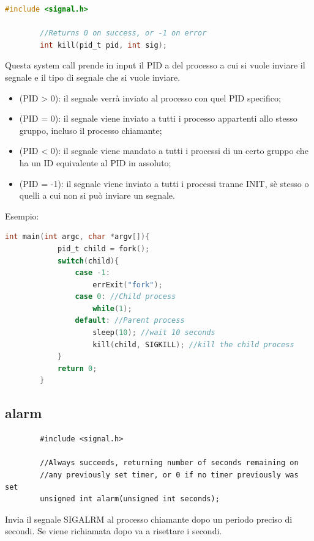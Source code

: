 \documentclass[a4paper, 12pt]{book}
\begin{document}
    \begin{lstlisting}[language=C]
        #include <signal.h>

        //Returns 0 on success, or -1 on error 
        int kill(pid_t pid, int sig);
    \end{lstlisting}
    Questa system call prende in input il PID a del processo 
    a cui si vuole inviare il segnale e il tipo di segnale che 
    si vuole inviare. 
    \begin{itemize}
        \item (PID > 0): il segnale verrà inviato al processo con quel PID specifico;
        \item (PID = 0): il segnale viene inviato a tutti i processo appartenti allo stesso gruppo, incluso il processo chiamante;
        \item (PID < 0): il segnale viene mandato a tutti i processi di un certo gruppo che ha un ID equivalente al PID in assoluto;
        \item (PID = -1): il segnale viene inviato a tutti i processi tranne INIT, sè stesso o quelli a cui non si può inviare un segnale.
    \end{itemize}
    Esempio:
    \begin{lstlisting}[language=C]
        int main(int argc, char *argv[]){
            pid_t child = fork();
            switch(child){
                case -1:
                    errExit("fork");
                case 0: //Child process 
                    while(1);
                default: //Parent process 
                    sleep(10); //wait 10 seconds 
                    kill(child, SIGKILL); //kill the child process
            }
            return 0;
        }
    \end{lstlisting}
    
    \subsection{alarm}

    \begin{lstlisting}
        #include <signal.h>

        //Always succeeds, returning number of seconds remaining on 
        //any previously set timer, or 0 if no timer previously was set 
        unsigned int alarm(unsigned int seconds);
    \end{lstlisting}
    Invia il segnale SIGALRM al processo chiamante dopo un 
    periodo preciso di secondi. Se viene richiamata dopo 
    va a risettare i secondi.
\end{document}
